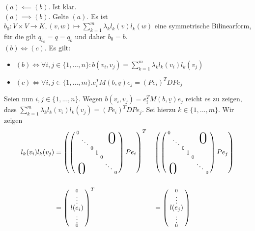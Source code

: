 \documentclass[../../main.tex]{subfiles}
\begin{document}
\begin{cproof}
$(a)\impliedby (b)$. Ist klar.\\

\noindent $(a)\implies (b)$. Gelte $(a)$. Es ist $b_0: V\times V\to K, (v,w)\mapsto \sum_{k=1}^m\lambda_k l_k(v)l_k(w)$ eine symmetrische Bilinearform, für die gilt $q_{b_0}=q=q_b$ und daher $b_0=b$.\\	

\noindent$(b)\Longleftrightarrow (c)$. Es gilt:
\begin{itemize}
\item $(b)\Longleftrightarrow \forall i,j\in\{1,...,n\}: b(v_i,v_j)=\sum_{k=1}^m\lambda_k l_k(v_i)l_k(v_j)$
\item $(c)\Longleftrightarrow \forall i,j\in\{1,...,m\}. e_i^TM(b,\underline{v})e_j=	(Pe_i)^TDPe_j$
\end{itemize}
Seien nun $i,j\in\{1,...,n\}$. Wegen $b(v_i,v_j)=e_i^TM(b,\underline{v})e_j$ reicht es zu zeigen, dass $\sum_{k=1}^m\lambda_k l_k(v_i)l_k(v_j)=(Pe_i)^TDPe_j$. Sei hierzu $k\in\{1,...,m\}$. Wir zeigen
\begin{align*}
l_k(v_i)l_k(v_j)&=\left(\left(\begin{smallmatrix}
0 & & & & & &\llap{$\overset{\blap{\Huge 0}}{~}$}\\
& \ddots & & & &\\ 
& & 0 & & & &\\
& & & \tikz[remember picture]\node[inner sep=0pt] (a) {\small 1}; & & &\\& & &  & 0 & &\\& & & & &\ddots &\\
\rlap{\tlap{\Huge 0}} & & & & & &0\end{smallmatrix}\right)Pe_i\right)^T& &\left(\left(\begin{smallmatrix}
0 & & & & & &\llap{$\overset{\blap{\Huge 0}}{~}$}\\
& \ddots & & & &\\ 
& & 0 & & & &\\
& & & \tikz[remember picture]\node[inner sep=0pt] (c) {\small 1}; & & &\\& & &  & 0 & &\\& & & & &\ddots &\\
\rlap{\tlap{\Huge 0}} & & & & & &0\end{smallmatrix}\right)Pe_j\right)\\
&\, & &\\
&=\cvec{0\\ \vdots\\\tikz[remember picture]\node[inner sep=0pt] (g) {$l(e_i)$};\\\vdots\\0}^T& &=\cvec{0\\ \vdots\\\tikz[remember picture]\node[inner sep=0pt] (e) {$l(e_j)$};\\\vdots\\0}

\end{align*}
\end{cproof}
\end{document}
